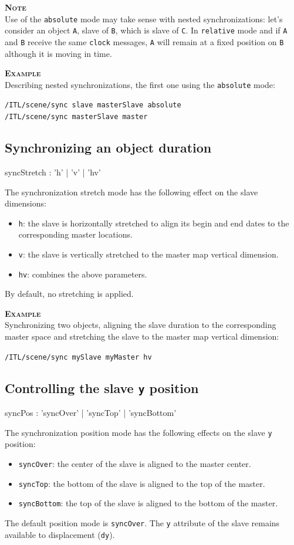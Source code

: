 \documentclass[a4paper,twoside]{report}
\newcommand{\subsublevel}[1]	{\subsection{#1}}
\newcommand{\OSC}[1]		{\texttt{#1}}
\newcommand{\values}[1]	{\texttt{#1}}
\newcommand{\example}		{\textbf{\hspace{-1.5cm}\textbf{\textsc{Example }}}}
\newcommand{\note}	[1]		{\vspace{2mm}\textbf{\hspace{-1.03cm}\textbf{\textsc{Note #1}}}}
\newcommand{\sample}	[1]			{\vspace{-2mm}\begin{center}\colorbox{mygrey}{
								\begin{minipage}[t]{0.9\columnwidth} 
								{\small \texttt{#1}}
								\end{minipage}}\end{center}}
\begin{document}
\note{} \\
Use of the \OSC{absolute} mode may take sense with nested synchronizations: let's consider an object \values{A}, slave of \values{B}, which is slave of \values{C}.
In \OSC{relative} mode and if \values{A} and \values{B} receive the same \OSC{clock} messages, \values{A} will remain at a fixed position on \values{B} although it is moving in time.

\example \\
Describing nested synchronizations, the first one using the \OSC{absolute} mode:
\sample{/ITL/scene/sync slave masterSlave absolute \\
/ITL/scene/sync masterSlave master
}

\subsublevel{Synchronizing an object duration}

\begin{rail}
syncStretch : 'h' | 'v' | 'hv'
\end{rail}

The synchronization stretch mode has the following effect on the slave dimensions:
\begin{itemize}
\item \OSC{h}: the slave is horizontally stretched to align its begin and end dates to the corresponding master locations.
\item \OSC{v}: the slave is vertically stretched to the master map vertical dimension.
\item \OSC{hv}: combines the above parameters.
\end{itemize}
By default, no stretching is applied.

\example \\
Synchronizing two objects, aligning the slave duration to the corresponding master space and stretching the slave to the master map vertical dimension:
\sample{/ITL/scene/sync mySlave myMaster hv}


\subsublevel{Controlling the slave \OSC{y} position}

\begin{rail}
syncPos : 'syncOver' | 'syncTop' | 'syncBottom'
\end{rail}

The synchronization position mode has the following effects on the slave \values{y} position:
\begin{itemize}
\item \OSC{syncOver}: the center of the slave is aligned to the master center.
\item \OSC{syncTop}: the bottom of the slave is aligned to the top of the master.
\item \OSC{syncBottom}: the top of the slave is aligned to the bottom of the master.
\end{itemize}
The default position mode is \OSC{syncOver}. The \OSC{y} attribute of the slave remains available to displacement (\OSC{dy}). 
\end{document}
